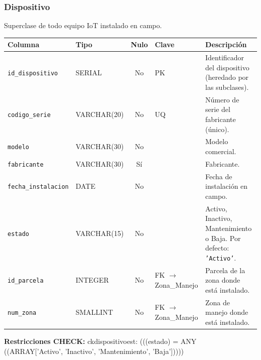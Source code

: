 \documentclass[11pt,letterpaper]{article}
\newcommand{\tbus}{\textunderscore\allowbreak}
\newcommand{\tb}[1]{{\ttfamily\let\_\tbus #1}}
\begin{document}
\subsubsection*{Dispositivo}
Superclase de todo equipo IoT instalado en campo.
{\footnotesize
\begin{longtable}{>{\raggedright\arraybackslash}p{3.3cm}>{\raggedright\arraybackslash}p{2.5cm}c>{\raggedright\arraybackslash}p{2.2cm}>{\raggedright\arraybackslash}p{6.1cm}}
\toprule
\textbf{Columna} & \textbf{Tipo} & \textbf{Nulo} & \textbf{Clave} & \textbf{Descripción} \\
\midrule
\endhead
\texttt{id\_dispositivo} & SERIAL & No & PK & Identificador del dispositivo (heredado por las subclases). \\
\texttt{codigo\_serie} & VARCHAR(20) & No & UQ & Número de serie del fabricante (único). \\
\texttt{modelo} & VARCHAR(30) & No &  & Modelo comercial. \\
\texttt{fabricante} & VARCHAR(30) & Sí &  & Fabricante. \\
\texttt{fecha\_instalacion} & DATE & No &  & Fecha de instalación en campo. \\
\texttt{estado} & VARCHAR(15) & No &  & Activo, Inactivo, Mantenimiento o Baja. Por defecto: \texttt{'Activo'}. \\
\texttt{id\_parcela} & INTEGER & No & FK $\to$ Zona\_Manejo & Parcela de la zona donde está instalado. \\
\texttt{num\_zona} & SMALLINT & No & FK $\to$ Zona\_Manejo & Zona de manejo donde está instalado. \\
\bottomrule
\end{longtable}}
{\footnotesize\textbf{Restricciones CHECK:} \tb{ck\_dispositivo\_est}: \tb{(((estado) = ANY ((ARRAY['Activo', 'Inactivo', 'Mantenimiento', 'Baja']))))}\par}
\medskip
\end{document}
